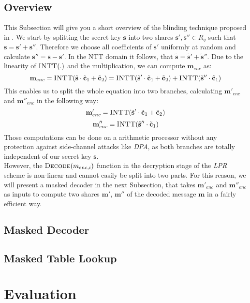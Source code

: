\subsection{Overview}
This Subsection will give you a short overview of the blinding technique proposed in \cite{maskedRing}. We start by splitting the secret key \(\textbf{s}\) into two shares \(\textbf{s}',\textbf{s}'' \in R_q\) such that \(\textbf{s}=\textbf{s}'+\textbf{s}''\). Therefore we choose all coefficients of \(\textbf{s}'\) uniformly at random and calculate \(\textbf{s}''=\textbf{s}-\textbf{s}'\). In the NTT domain it follows, that \(\tilde{\textbf{s}}=\tilde{\textbf{s}}'+\tilde{\textbf{s}}''\). Due to the linearity of \(\textsc{INTT}(.)\) and the multiplication, we can compute \(\textbf{m}_{enc}\) as:
\begin{equation}
	\textbf{m}_{enc}=\textsc{INTT}(\tilde{\textbf{s}} \cdot \tilde{\textbf{c}}_1+\tilde{\textbf{c}}_2)=\textsc{INTT}(\tilde{\textbf{s}}' \cdot \tilde{\textbf{c}}_1+\tilde{\textbf{c}}_2)+\textsc{INTT}(\tilde{\textbf{s}}'' \cdot \tilde{\textbf{c}}_1)
\end{equation}
This enables us to split the whole equation into two branches, calculating \(\textbf{m}'_{enc}\) and \(\textbf{m}''_{enc}\) in the following way:
\begin{equation}
	\textbf{m}'_{enc}=\textsc{INTT}(\tilde{\textbf{s}}' \cdot \tilde{\textbf{c}}_1+\tilde{\textbf{c}}_2)
\end{equation}
\begin{equation}
	\textbf{m}''_{enc}=\textsc{INTT}(\tilde{\textbf{s}}'' \cdot \tilde{\textbf{c}}_1)
\end{equation}
Those computations can be done on a arithmetic processor without any protection against side-channel attacks like \textit{DPA}, as both branches are totally independent of our secret key \(\textbf{s}\).\\
However, the \(\textsc{Decode}(m_{enc,i})\) function in the decryption stage of the \textit{LPR} scheme is non-linear and cannot easily be split into two parts. For this reason, we will present a masked decoder in the next Subsection, that takes \(\textbf{m}'_{enc}\) and \(\textbf{m}''_{enc}\) as inputs to compute two shares \(\textbf{m}'\), \(\textbf{m}''\) of the decoded message \(\textbf{m}\) in a fairly efficient way. 


\subsection{Masked Decoder}

\subsection{Masked Table Lookup}

\section{Evaluation}